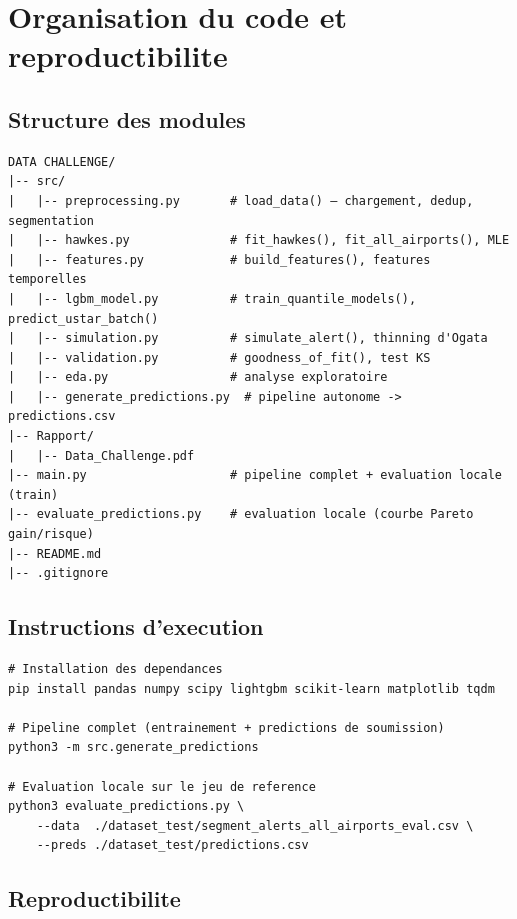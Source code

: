 \documentclass[a4paper,11pt]{article}
\begin{document}
\section{Organisation du code et reproductibilite}

\subsection{Structure des modules}

\begin{verbatim}
DATA CHALLENGE/
|-- src/
|   |-- preprocessing.py       # load_data() — chargement, dedup, segmentation
|   |-- hawkes.py              # fit_hawkes(), fit_all_airports(), MLE
|   |-- features.py            # build_features(), features temporelles
|   |-- lgbm_model.py          # train_quantile_models(), predict_ustar_batch()
|   |-- simulation.py          # simulate_alert(), thinning d'Ogata
|   |-- validation.py          # goodness_of_fit(), test KS
|   |-- eda.py                 # analyse exploratoire
|   |-- generate_predictions.py  # pipeline autonome -> predictions.csv
|-- Rapport/
|   |-- Data_Challenge.pdf
|-- main.py                    # pipeline complet + evaluation locale (train)
|-- evaluate_predictions.py    # evaluation locale (courbe Pareto gain/risque)
|-- README.md
|-- .gitignore
\end{verbatim}

\subsection{Instructions d'execution}

\begin{lstlisting}
# Installation des dependances
pip install pandas numpy scipy lightgbm scikit-learn matplotlib tqdm

# Pipeline complet (entrainement + predictions de soumission)
python3 -m src.generate_predictions

# Evaluation locale sur le jeu de reference
python3 evaluate_predictions.py \
    --data  ./dataset_test/segment_alerts_all_airports_eval.csv \
    --preds ./dataset_test/predictions.csv
\end{lstlisting}

\subsection{Reproductibilite}
\end{document}

